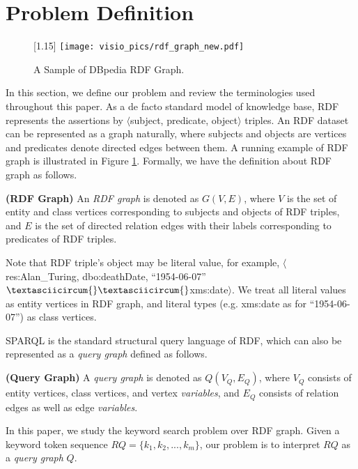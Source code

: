 \section{Problem Definition}\label{sec:problemdef}

\begin{figure} [t]
	\centering
	\scalebox{1.05}[1.15]
	{
		\resizebox{\linewidth}{!}
		{
			\texttt{[image: visio\_pics/rdf\_graph\_new.pdf]}
		}
	}
	\vspace{-0.1in}
	\caption{A Sample of DBpedia RDF Graph.}
	\label{fig:rdfgraph}
	\vspace{-0.2in}
\end{figure}

In this section, we define our problem and review the terminologies used throughout this paper. As a de facto standard model of knowledge base, RDF represents the assertions by $\langle$subject, predicate, object$\rangle$ triples. An RDF dataset can be represented as a graph naturally, where subjects and objects are vertices and predicates denote directed edges between them. A running example of RDF graph is illustrated in Figure \ref{fig:rdfgraph}. Formally, we have the definition about RDF graph as follows.


\begin{definition} \label{def:rdfgraph}
	\textbf{ (RDF Graph) }
	An \textit{RDF graph} is denoted as $G(V, E)$, where
	$V$ is the set of entity and class vertices corresponding to subjects and objects of RDF triples,
	and $E$ is the set of directed relation edges with their labels corresponding to predicates of RDF triples.

\end{definition}

Note that RDF triple's object may be literal value, for example, $\langle$res:Alan\_Turing, dbo:deathDate, ``1954-06-07'' $\textasciicircum{}\textasciicircum{}$xms:date$\rangle$. We treat all literal values as entity vertices in RDF graph, and literal types (e.g. xms:date as for ``1954-06-07'') as class vertices. 

SPARQL is the standard structural query language of RDF, which can also be represented as a \emph{query graph} defined as follows.

\begin{definition} \textbf{ (Query Graph) }
	A \textit{query graph} is denoted as $Q(V_Q, E_Q)$, where
	$V_Q$ consists of entity vertices, class vertices, and vertex \emph{variables},
	and $E_Q$ consists of relation edges as well as edge \emph{variables}.
\end{definition}

In this paper, we study the keyword search problem over RDF graph. Given a keyword token sequence $RQ = \{k_1, k_2, ..., k_m\}$, our problem is to interpret $RQ$ as a \emph{query graph} $Q$. 
